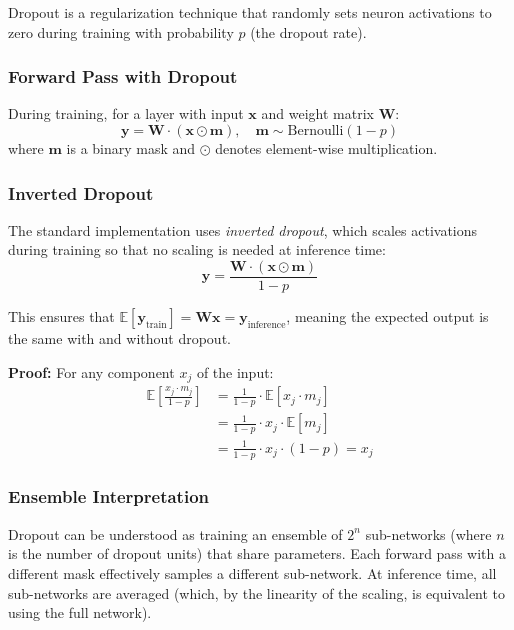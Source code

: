 Dropout \cite{srivastava2014dropout} is a regularization technique that randomly sets neuron activations to zero during training with probability $p$ (the dropout rate).

\subsubsection{Forward Pass with Dropout}

During training, for a layer with input $\mathbf{x}$ and weight matrix $\mathbf{W}$:
\begin{equation}
\mathbf{y} = \mathbf{W} \cdot (\mathbf{x} \odot \mathbf{m}), \quad \mathbf{m} \sim \text{Bernoulli}(1 - p)
\end{equation}
where $\mathbf{m}$ is a binary mask and $\odot$ denotes element-wise multiplication.

\subsubsection{Inverted Dropout}

The standard implementation uses \emph{inverted dropout}, which scales activations during training so that no scaling is needed at inference time:
\begin{equation}
\mathbf{y} = \frac{\mathbf{W} \cdot (\mathbf{x} \odot \mathbf{m})}{1 - p}
\end{equation}

This ensures that $\mathbb{E}[\mathbf{y}_{\text{train}}] = \mathbf{W}\mathbf{x} = \mathbf{y}_{\text{inference}}$, meaning the expected output is the same with and without dropout.

\textbf{Proof:} For any component $x_j$ of the input:
\begin{align}
\mathbb{E}\left[\frac{x_j \cdot m_j}{1 - p}\right] &= \frac{1}{1-p} \cdot \mathbb{E}[x_j \cdot m_j] \\
&= \frac{1}{1-p} \cdot x_j \cdot \mathbb{E}[m_j] \\
&= \frac{1}{1-p} \cdot x_j \cdot (1 - p) = x_j
\end{align}

\subsubsection{Ensemble Interpretation}

Dropout can be understood as training an ensemble of $2^n$ sub-networks (where $n$ is the number of dropout units) that share parameters. Each forward pass with a different mask effectively samples a different sub-network. At inference time, all sub-networks are averaged (which, by the linearity of the scaling, is equivalent to using the full network).

